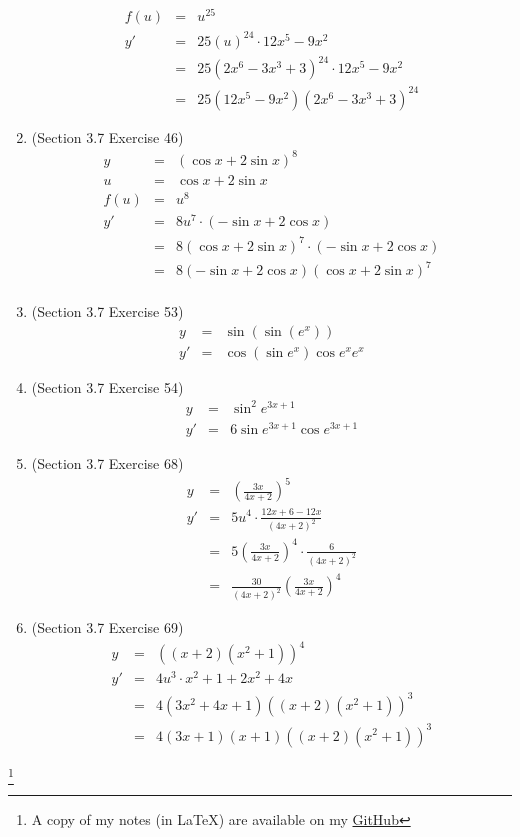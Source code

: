 \documentclass{article}
\newcommand\blfootnote[1]{
    \begingroup
    \renewcommand\thefootnote{}\footnote{#1}
    \addtocounter{footnote}{-1}
    \endgroup
}
\begin{document}
\begin{enumerate}
\begin{eqnarray}
            f(u) &=& u^{25} \\
            y' &=& 25\left(u\right)^{24} \cdot 12x^5 - 9x^2 \\
               &=& 25\left(2x^6 - 3x^3 + 3\right)^{24} \cdot 12x^5 - 9x^2 \\
               &=& 25\left(12x^5 - 9x^2\right)\left(2x^6 - 3x^3 + 3\right)^{24}
        \end{eqnarray}
    \item (Section 3.7 Exercise 46)
        \begin{eqnarray}
            y &=& (\cos{x} + 2\sin{x})^8 \\
            u &=& \cos{x} + 2\sin{x} \\
            f(u) &=& u^8 \\
            y' &=& 8u^7 \cdot (-\sin{x} + 2\cos{x}) \\
               &=& 8\left(\cos{x} + 2\sin{x}\right)^7 \cdot (-\sin{x} + 2\cos{x}) \\
               &=& 8(-\sin{x} + 2\cos{x})\left(\cos{x} + 2\sin{x}\right)^7 \\
        \end{eqnarray}
    \item (Section 3.7 Exercise 53)
        \begin{eqnarray}
            y &=& \sin{(\sin{(e^x)})} \\
            y' &=& \cos{(\sin{e^x})}\cos{e^x}e^x
        \end{eqnarray}
    \item (Section 3.7 Exercise 54)
        \begin{eqnarray}
            y &=& \sin^2{e^{3x + 1}} \\
            y' &=& 6\sin{e^{3x+1}}\cos{e^{3x+1}}
        \end{eqnarray}
    \item (Section 3.7 Exercise 68)
        \begin{eqnarray}
            y &=& \left(\frac{3x}{4x+2}\right)^5 \\
            y' &=& 5u^4 \cdot \frac{12x+6 - 12x}{\left(4x+2\right)^2} \\
               &=& 5\left(\frac{3x}{4x+2}\right)^4 \cdot \frac{6}{\left(4x+2\right)^2} \\
               &=& \frac{30}{\left(4x+2\right)^2}\left(\frac{3x}{4x+2}\right)^4
        \end{eqnarray}
    \item (Section 3.7 Exercise 69)
        \begin{eqnarray}
            y &=& \left(\left(x+2\right)\left(x^2+1\right)\right)^4 \\
            y' &=& 4u^3 \cdot x^2 + 1 + 2x^2 + 4x \\
               &=& 4\left(3x^2 + 4x + 1\right)\left(\left(x+2\right)\left(x^2+1\right)\right)^3 \\
               &=& 4\left(3x + 1\right)\left(x + 1\right)\left(\left(x+2\right)\left(x^2+1\right)\right)^3
        \end{eqnarray}
\end{enumerate}

\blfootnote{A copy of my notes (in \LaTeX) are available on my \href{https://github.com/onlinechronically/MATH-211}{GitHub}}
\end{document}
